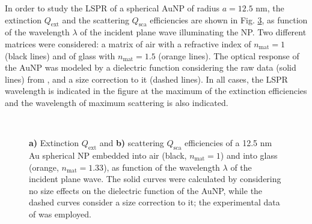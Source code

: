 In order to study the LSPR of a spherical AuNP of radius $a = 12.5$ nm, the extinction  $Q_\text{ext}$ and the scattering  $Q_\text{sca}$ efficiencies are shown in Fig. \ref{fig:Mieefficiencies}, as function of the wavelength $\lambda$ of the incident plane wave illuminating the NP. Two different matrices were considered: a matrix of air with a refractive index of $n_\text{mat} = 1$ (black lines) and of glass with $n_\text{mat} = 1.5$ (orange lines). The optical response of the AuNP was modeled by a dielectric function considering the raw data (solid lines) from \citeauthor{johnson_optical_1972} \cite{johnson_optical_1972}, and a size correction to it (dashed lines). In all cases, the LSPR wavelength is indicated in the figure at the maximum of the extinction efficiencies and the wavelength of maximum scattering is also indicated.

\begin{figure}[h!]
	\def\svgwidth{1\textwidth} \small
  \vspace*{3.0em}
  \hspace*{-.25\textwidth}
    \begin{subfigure}{.51\textwidth}\caption{ }\label{fig:Mieefficiencies:a}\end{subfigure}
    \begin{subfigure}{.49\textwidth}\caption{ }\label{fig:Mieefficiencies:b}\end{subfigure}
  \vspace*{-6.em}\\
  \vspace*{-2em}
  \caption[Extinction and Scattering Efficiency of a 12.5 nm Au Spherical NP embedded into Air and Glass]{ \textbf{a)} Extinction $Q_\text{ext}$ and \textbf{b)} scattering $Q_\text{sca}$ efficiencies of a 12.5 nm Au spherical NP embedded into air (black, $n_\text{mat} = 1$)  and into glass (orange, $n_\text{mat} = 1.33$), as function of the wavelength $\lambda$ of the incident plane wave.  The solid curves were calculated by considering no size effects on the dielectric function of the AuNP, while the dashed curves consider a size correction to it; the experimental data of \citeauthor{johnson_optical_1972} \cite{johnson_optical_1972} was employed.}
\label{fig:Mieefficiencies}
\end{figure}

